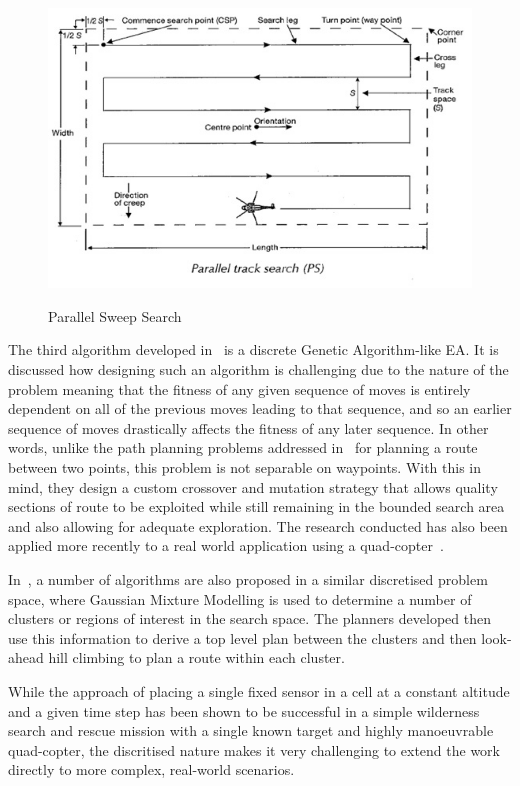 \documentclass[10pt,a4paper, oneside, conference]{IEEEtran}
\begin{document}
	\begin{figure}[h]
	\caption{Parallel Sweep Search\protect\footnotemark}
	\includegraphics[width=\linewidth]{parallelSweepSearch.jpg}
	\label{fig:parallelSweep}	
	\end{figure}
	
	The third algorithm developed in~\cite{Lin2009} is a discrete Genetic Algorithm-like EA.
	It is discussed how designing such an algorithm is challenging due to the nature of the problem meaning that the fitness of any given sequence of moves is entirely dependent on all of the previous moves leading to that sequence, and so an earlier sequence of moves drastically affects the fitness of any later sequence. 
	In other words, unlike the path planning problems addressed in~\cite{Yang2015} for planning a route between two points, this problem is not separable on waypoints. 
	With this in mind, they design a custom crossover and mutation strategy that allows quality sections of route to be exploited while still remaining in the bounded search area and also allowing for adequate exploration.
	The research conducted has also been applied more recently to a real world application using a quad-copter~\cite{Agcayazi2016}.
	
	In~\cite{Lin2014}, a number of algorithms are also proposed in a similar discretised problem space, where Gaussian Mixture Modelling is used to determine a number of clusters or regions of interest in the search space.
	The planners developed then use this information to derive a top level plan between the clusters and then look-ahead hill climbing to plan a route within each cluster.
	
	While the approach of placing a single fixed sensor in a cell at a constant altitude and a given time step has been shown to be successful in a simple wilderness search and rescue mission with a single known target and highly manoeuvrable quad-copter, the discritised nature makes it very challenging to extend the work directly to more complex, real-world scenarios.
	
\end{document}
